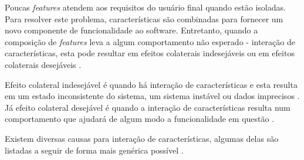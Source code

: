 Poucas \textit{features} atendem aos requisitos do usuário final quando estão isoladas. Para resolver este problema, características são combinadas para fornecer um novo componente de funcionalidade ao software. Entretanto, quando a composição de \textit{features} leva a algum comportamento não esperado - interação de características, esta pode resultar em efeitos colaterais indesejáveis \cite{NHLABATSI:2008} ou em efeitos colaterais desejáveis \cite{Weiss:2005, Wilson:2005}.

Efeito colateral indesejável é quando há interação de características e esta resulta em um estado inconsistente do sistema, um sistema instável ou dados imprecisos \cite{NHLABATSI:2008}. Já efeito colateral desejável é quando a interação de características resulta num comportamento que ajudará de algum modo a funcionalidade em questão \cite{Weiss:2005, Wilson:2005}.

Existem diversas causas para interação de características, algumas delas são listadas a seguir de forma mais genérica possível \cite{Weiss:2007}.

